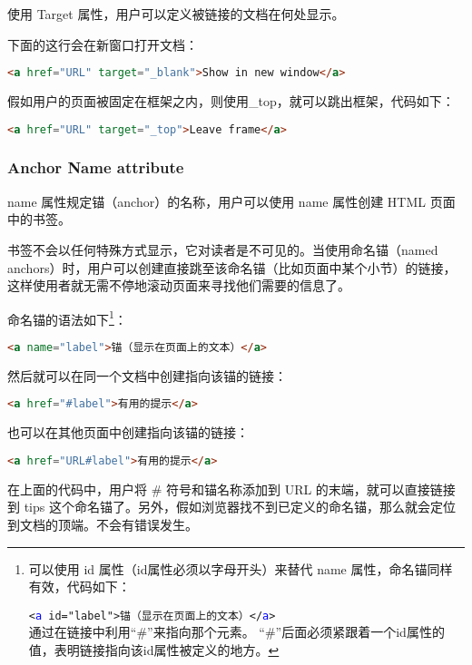 使用 Target 属性，用户可以定义被链接的文档在何处显示。

下面的这行会在新窗口打开文档：

\begin{lstlisting}[language=HTML]
	<a href="URL" target="_blank">Show in new window</a>
\end{lstlisting}

假如用户的页面被固定在框架之内，则使用\_top，就可以跳出框架，代码如下：

\begin{lstlisting}[language=HTML]
	<a href="URL" target="_top">Leave frame</a>
\end{lstlisting}

\subsubsection{Anchor Name attribute}

name 属性规定锚（anchor）的名称，用户可以使用 name 属性创建 HTML 页面中的书签。

书签不会以任何特殊方式显示，它对读者是不可见的。当使用命名锚（named anchors）时，用户可以创建直接跳至该命名锚（比如页面中某个小节）的链接，这样使用者就无需不停地滚动页面来寻找他们需要的信息了。

命名锚的语法如下\footnote{ {\raggedright 可以使用 id 属性（id属性必须以字母开头）来替代 name 属性，命名锚同样有效，代码如下：\\} {\centering \texttt{<\textcolor{Blue}{a} id="label">锚（显示在页面上的文本）</\textcolor{Blue}{a}>} \\}  \indent \indent 通过在链接中利用“\#”来指向那个元素。 “\#”后面必须紧跟着一个id属性的值，表明链接指向该id属性被定义的地方。}：

\begin{lstlisting}[language=HTML]
	<a name="label">锚（显示在页面上的文本）</a>
\end{lstlisting}


然后就可以在同一个文档中创建指向该锚的链接：

\begin{lstlisting}[language=HTML]
	<a href="#label">有用的提示</a>
\end{lstlisting}


也可以在其他页面中创建指向该锚的链接：

\begin{lstlisting}[language=HTML]
	<a href="URL#label">有用的提示</a>
\end{lstlisting}

在上面的代码中，用户将 \# 符号和锚名称添加到 URL 的末端，就可以直接链接到 tips 这个命名锚了。另外，假如浏览器找不到已定义的命名锚，那么就会定位到文档的顶端。不会有错误发生。

